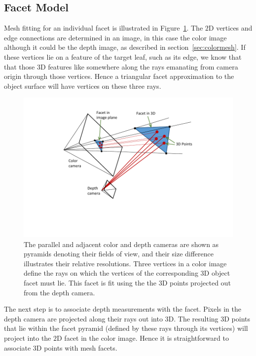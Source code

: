 \subsection{Facet Model}

Mesh fitting for an individual facet is illustrated in Figure~\ref{fig:facet}.  The $2$D vertices and edge connections are determined in an image, in this case the color image although it could be the depth image, as described in section~\ref{sec:colormesh}.  If these vertices lie on a feature of the target leaf, such as its edge, we know that that those $3$D features like somewhere along the rays emanating from camera origin through those vertices.  Hence a triangular facet approximation to the object surface will have vertices on these three rays.  

\begin{figure}
\begin{center}
   \includegraphics[trim=80 70 70 20,clip,width=0.95\linewidth]{Figures/pointFittingConcept}
\end{center}
   \caption{The parallel and adjacent color and depth cameras are shown as pyramids denoting their fields of view, and their size difference illustrates their relative resolutions.  Three vertices in a color image define the rays on which the vertices of the corresponding $3$D object facet must lie.  This facet is fit using the the $3$D points projected out from the depth camera.}
\label{fig:facet}
\end{figure}

The next step is to associate depth measurements with the facet.  Pixels in the depth camera are projected along their rays out into $3$D.  The resulting $3$D points that lie within the facet pyramid (defined by these rays through its vertices) will project into the $2$D facet in the color image.  Hence it is straightforward to associate $3$D points with mesh facets.  

